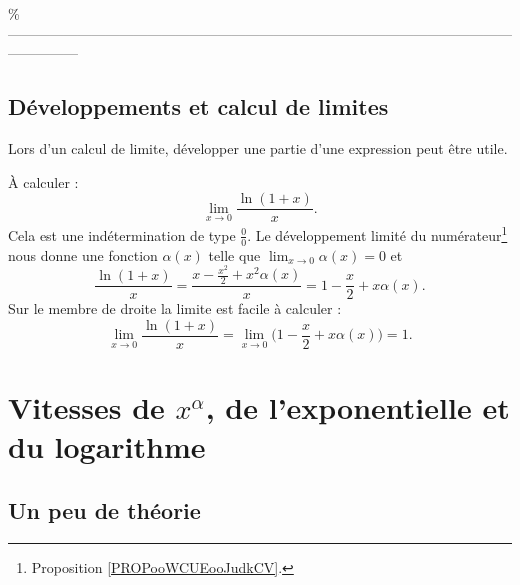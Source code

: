 \%--------------------------------------------------------------------------------------------------------------------------- 
\subsection{Développements et calcul de limites}

Lors d'un calcul de limite, développer une partie d'une expression peut être utile.

\begin{example}
    À calculer :
    \begin{equation}
        \lim_{x\to 0} \frac{ \ln(1+x) }{ x }.
    \end{equation}
    Cela est une indétermination de type \( \frac{ 0 }{ 0 }\). Le développement limité du numérateur\footnote{Proposition \ref{PROPooWCUEooJudkCV}.} nous donne une fonction \( \alpha(x)\) telle que \( \lim_{x\to 0} \alpha(x)=0\) et
    \begin{equation}
        \frac{ \ln(1+x) }{ x }=\frac{ x-\frac{ x^2 }{2}+x^2\alpha(x) }{ x }=1-\frac{ x }{ 2 }+x\alpha(x).
    \end{equation}
    Sur le membre de droite la limite est facile à calculer :
    \begin{equation}
        \lim_{x\to 0} \frac{ \ln(1+x) }{ x }=\lim_{x\to 0} \Big( 1-\frac{ x }{ 2 }+x\alpha(x) \Big) =1.
    \end{equation}
\end{example}

\section{Vitesses de $x^{\alpha}$, de l'exponentielle et du logarithme}

\subsection{Un peu de théorie}


